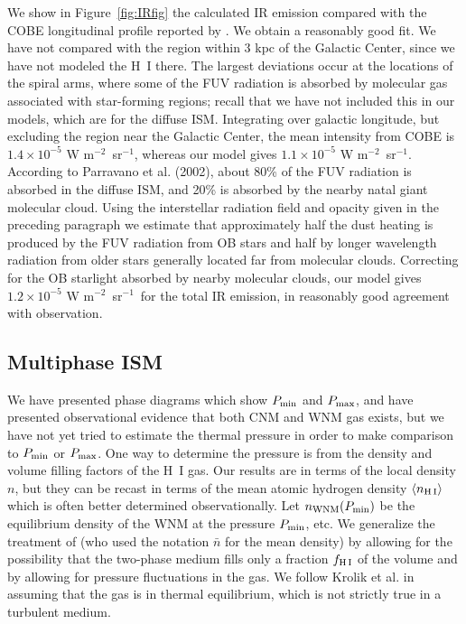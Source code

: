 \documentclass[12pt,preprint,flushrt]{aastex}
\newcommand{\e}{$^{-1}$}
\newcommand{\ee}{$^{-2}$}
\newcommand{\pmax}{P_{\rm max}}
\newcommand{\pmin}{P_{\rm min}}
\begin{document}
We show in Figure~\ref{fig:IRfig} the calculated IR emission compared with
the COBE longitudinal profile reported by \cite{sod94}. We obtain a reasonably
good fit.
We have not compared with the region within 3 kpc of the Galactic
Center, since we have not modeled the H~I there.
The largest deviations occur at the locations of the spiral arms,
where some of the FUV radiation is absorbed by molecular gas
associated with star-forming regions; recall that we have
not included this in our models, which are for the diffuse ISM.
Integrating over galactic longitude, but excluding the region
near the Galactic Center, the mean intensity from COBE is
$1.4\times 10^{-5}$ W m\ee\ sr\e, whereas our model
gives $1.1\times 10^{-5}$ W m\ee\ sr\e.  According to
Parravano et al. (2002), about 80\% of the FUV radiation is absorbed
in the diffuse ISM, and 20\% is absorbed by the nearby 
natal giant molecular cloud. Using the interstellar radiation field
and opacity given in the preceding paragraph we estimate 
that approximately half the dust heating is  produced by
the FUV 
radiation from OB stars and half by longer wavelength 
radiation from older stars generally located far from molecular
clouds. Correcting for the OB starlight
absorbed by nearby molecular clouds, 
our model
gives $1.2\times 10^{-5}$ W m\ee\ sr\e\ for the total IR emission,
in reasonably good agreement with observation.

\subsection{Multiphase ISM}\label{sub:ISM2phase}

We have presented phase diagrams which show $\pmin$ and $\pmax$, and 
have presented observational evidence that both CNM and WNM gas exists,
but we have not yet tried to estimate the thermal pressure 
in order to make comparison to $\pmin$ or $\pmax$. One way to 
determine the pressure is from the density and volume filling
factors
of the H~I gas.
Our results are in terms of the local density $n$, but
they can be recast in terms of the mean atomic hydrogen 
density $\langle n_{\rm H\, I} \rangle $
which is often better determined observationally.
Let $n_{\rm WNM}(P_{\rm min})$ be the equilibrium density
of the WNM at the pressure $P_{\rm min}$, etc.  We generalize the
treatment of \cite{kro81} (who used the notation $\bar{n}$ for the mean
density) by allowing for the possibility
that the two-phase medium fills only a fraction $f_{\rm H\,I}$ of the volume
and by allowing for pressure fluctuations in the gas.
We follow Krolik
et al. in assuming that the gas is in thermal equilibrium,
which is not strictly true in a turbulent medium.
\end{document}
